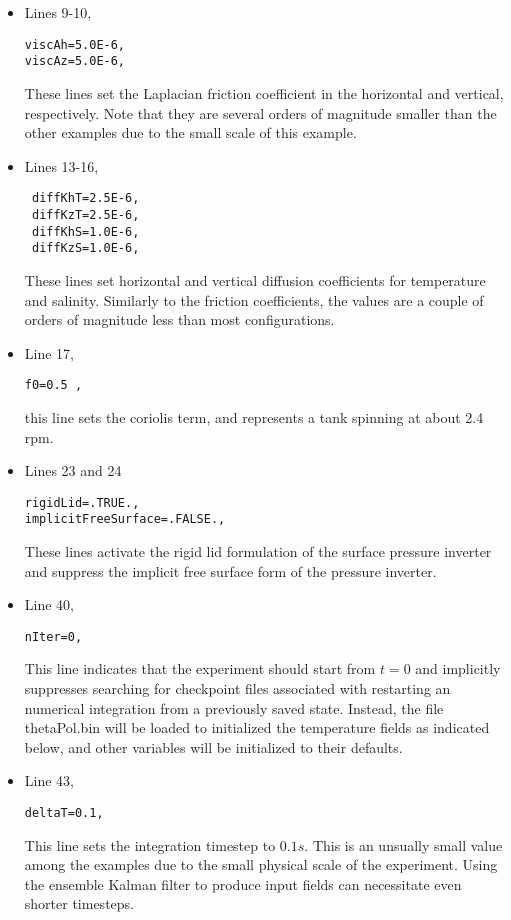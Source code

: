 \begin{itemize}

\item Lines 9-10, \begin{verbatim} 
viscAh=5.0E-6, 
viscAz=5.0E-6,
\end{verbatim} 


These lines set the Laplacian friction coefficient in the horizontal
and vertical, respectively.  Note that they are several orders of
magnitude smaller than the other examples due to the small scale of
this example.

\item Lines 13-16, \begin{verbatim} 
 diffKhT=2.5E-6,
 diffKzT=2.5E-6,
 diffKhS=1.0E-6,
 diffKzS=1.0E-6,

\end{verbatim} 


These lines set horizontal and vertical diffusion coefficients for
temperature and salinity.  Similarly to the friction coefficients, the
values are a couple of orders of magnitude less than most
 configurations.


\item Line 17, \begin{verbatim}f0=0.5 , \end{verbatim} this line sets the 
coriolis term, and represents a tank spinning at about 2.4 rpm.

\item Lines 23 and 24
\begin{verbatim}
rigidLid=.TRUE.,
implicitFreeSurface=.FALSE.,
\end{verbatim}

These lines activate  the rigid lid formulation of the surface
pressure inverter and suppress the implicit free surface form
of the pressure inverter.

\item Line 40,
\begin{verbatim}
nIter=0,
\end{verbatim}
This line indicates that the experiment should start from $t=0$ and
implicitly suppresses searching for checkpoint files associated with
restarting an numerical integration from a previously saved state.
Instead, the file thetaPol.bin will be loaded to initialized the
temperature fields as indicated below, and other variables will be
initialized to their defaults.


\item Line 43,
\begin{verbatim}
deltaT=0.1,
\end{verbatim}
This line sets the integration timestep to $0.1s$.  This is an
unsually small value among the examples due to the small physical
scale of the experiment.  Using the ensemble Kalman filter to produce
input fields can necessitate even shorter timesteps.


\end{itemize}
